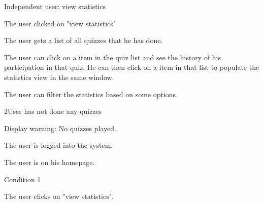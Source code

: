 

\begin{uc}{Independent user: view statistics}

    \begin{uc-mss}
    \item The user clicked on "view statistics"
    \item The user gets a list of all quizzes that he has done. 
    \item The user can click on a item in the quiz list and see the history of his participation in that quiz. He can then click on a item in that list to populate the statistics view in the same window.
    \item The user can filter the statistics based on some options.
    \end{uc-mss}

    \begin{uc-ext}

        \begin{uc-fail}{2}{User has not done any quizzes}
        \item Display warning: No quizzes played.
        \end{uc-fail}

    \end{uc-ext}

    \begin{uc-pre}
    \item The user is logged into the system.
    \item The user is on his homepage.
    \end{uc-pre}

    \begin{uc-post}
    \item Condition 1
    \end{uc-post}

    \begin{uc-trig}
    \item The user clicks on "view statistics".
    \end{uc-trig}

\end{uc}